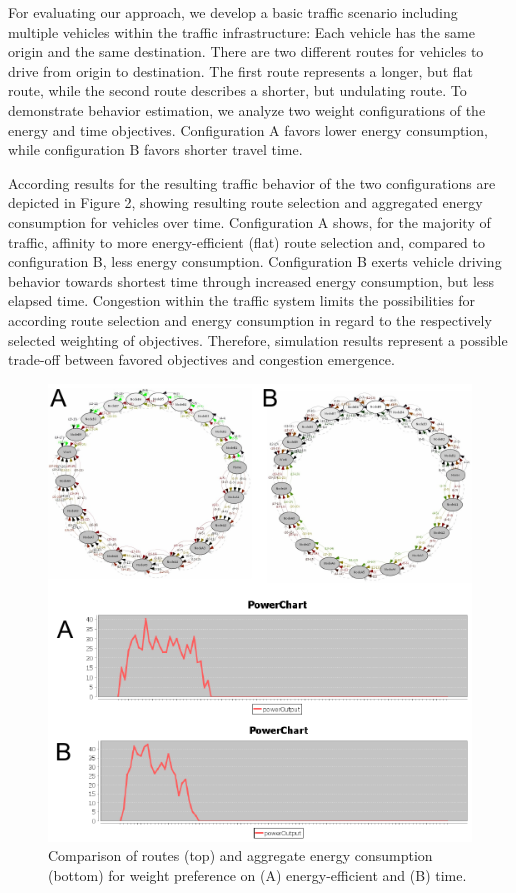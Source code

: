 \documentclass[conference]{../cls/IEEEtran}
\begin{document}
For evaluating our approach, we develop a basic traffic scenario
including multiple vehicles within the traffic infrastructure: Each vehicle has
the same origin and the same destination. There are two different
routes for vehicles to drive from origin to destination. The first route
represents a longer, but flat route, while the second route describes a shorter,
but undulating route.
To demonstrate behavior estimation, we analyze two weight configurations of the
energy and time objectives.
Configuration A favors lower energy consumption, while
configuration B favors shorter travel time.

According results for the resulting traffic behavior of the two configurations
are depicted in Figure 2, showing resulting route selection and aggregated
energy consumption for vehicles over time. Configuration A shows, for the
majority of traffic, affinity to more energy-efficient (flat) route selection
and, compared to configuration B, less energy consumption. Configuration B
exerts vehicle driving behavior towards shortest time through increased energy
consumption, but less elapsed time. Congestion within the
traffic system limits the possibilities for according route selection and
energy consumption in regard to the respectively selected weighting of
objectives. Therefore, simulation results represent a
possible trade-off between favored objectives and congestion emergence.

\begin{figure}[t!]
	\includegraphics[width=\columnwidth]{../gfx/results.pdf}
	\caption{Comparison of routes (top) and aggregate energy consumption
	(bottom) for weight preference  on (A) energy-efficient and (B) time.}
	\label{figure:results}
\end{figure}
\end{document}
